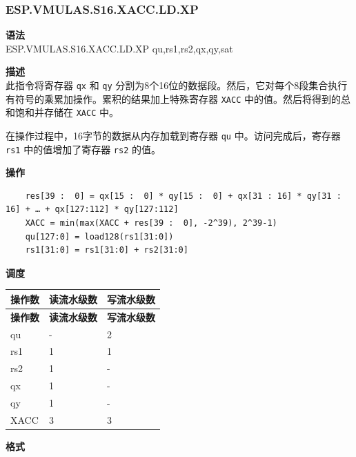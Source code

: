 \newpage

\newpage
\subsubsection{ESP.VMULAS.S16.XACC.LD.XP}\label{instruction:ESPVMULASS16XACCLDXP}
\textbf{语法}\\
ESP.VMULAS.S16.XACC.LD.XP qu,rs1,rs2,qx,qy,sat

\textbf{描述}\\
此指令将寄存器 \lstinline{qx} 和 \lstinline{qy} 分割为8个16位的数据段。然后，它对每个8段集合执行有符号的乘累加操作。累积的结果加上特殊寄存器 \lstinline{XACC} 中的值。然后将得到的总和饱和并存储在 \lstinline{XACC} 中。

在操作过程中，16字节的数据从内存加载到寄存器 \lstinline{qu} 中。访问完成后，寄存器 \lstinline{rs1} 中的值增加了寄存器 \lstinline{rs2} 的值。

\textbf{操作}\\
\begin{lstlisting}
    res[39 :  0] = qx[15 :  0] * qy[15 :  0] + qx[31 : 16] * qy[31 : 16] + … + qx[127:112] * qy[127:112]
    XACC = min(max(XACC + res[39 :  0], -2^39), 2^39-1)
    qu[127:0] = load128(rs1[31:0])
    rs1[31:0] = rs1[31:0] + rs2[31:0]
\end{lstlisting}

\textbf{调度}\\
\begin{longtable}[c]{|l|l|l|}
    \hline
    \rowcolor{lightgray}
    \textbf{操作数} & \textbf{读流水级数} & \textbf{写流水级数} \\\hline
    \endfirsthead
    \hline
    \rowcolor{lightgray}
     \textbf{操作数} & \textbf{读流水级数} & \textbf{写流水级数} \\\hline
    \endhead
    \hline
    \endfoot

    qu & - & 2 \\\hline
    rs1 & 1 & 1 \\\hline
    rs2 & 1 & - \\\hline
     qx & 1 & - \\\hline
     qy & 1 & - \\\hline
     XACC & 3 & 3
\end{longtable}

\textbf{格式}\\

